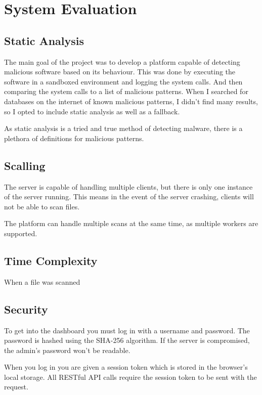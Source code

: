 \chapter{System Evaluation}

\section{Static Analysis}
The main goal of the project was to develop a platform capable of detecting malicious software based on its behaviour.
This was done by executing the software in a sandboxed environment and logging the system calls.
And then comparing the system calls to a list of malicious patterns.
When I searched for databases on the internet of known malicious patterns,
I didn't find many results, so I opted to include static analysis as well as a fallback.

As static analysis is a tried and true method of detecting malware,
there is a plethora of definitions for malicious patterns.

\section{Scalling}
The server is capable of handling multiple clients, but there is only one instance of the server running.
This means in the event of the server crashing, clients will not be able to scan files.

The platform can handle multiple scans at the same time, as multiple workers are supported.

\section{Time Complexity}
When a file was scanned 

\section{Security}
To get into the dashboard you must log in with a username and password.
The password is hashed using the SHA-256 algorithm.
If the server is compromised, the admin's password won't be readable.

When you log in you are given a session token which is stored in the browser's local storage.
All RESTful API calls require the session token to be sent with the request.

